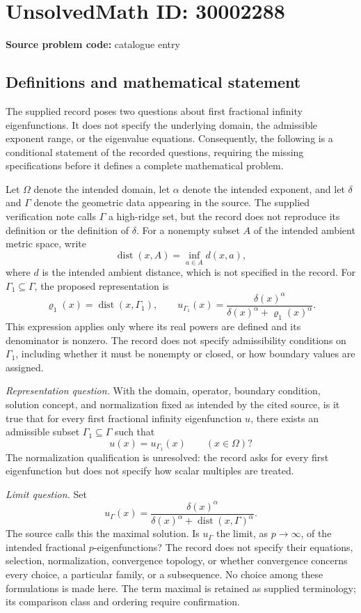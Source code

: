 \documentclass[11pt]{article}
\begin{document}
\section*{UnsolvedMath ID: 30002288}
\textbf{Source problem code:} catalogue entry
\subsection{Definitions and mathematical statement}
The supplied record poses two questions about first fractional infinity eigenfunctions. It does not specify the underlying domain, the admissible exponent range, or the eigenvalue equations. Consequently, the following is a conditional statement of the recorded questions, requiring the missing specifications before it defines a complete mathematical problem.

Let \(\Omega\) denote the intended domain, let \(\alpha\) denote the intended exponent, and let \(\delta\) and \(\Gamma\) denote the geometric data appearing in the source. The supplied verification note calls \(\Gamma\) a high-ridge set, but the record does not reproduce its definition or the definition of \(\delta\). For a nonempty subset \(A\) of the intended ambient metric space, write
\[
\operatorname{dist}(x,A)=\inf_{a\in A}d(x,a),
\]
where \(d\) is the intended ambient distance, which is not specified in the record. For \(\Gamma_1\subseteq\Gamma\), the proposed representation is
\[
\varrho_1(x)=\operatorname{dist}(x,\Gamma_1),\qquad
u_{\Gamma_1}(x)=\frac{\delta(x)^\alpha}{\delta(x)^\alpha+\varrho_1(x)^\alpha}.
\]
This expression applies only where its real powers are defined and its denominator is nonzero. The record does not specify admissibility conditions on \(\Gamma_1\), including whether it must be nonempty or closed, or how boundary values are assigned.

\emph{Representation question.} With the domain, operator, boundary condition, solution concept, and normalization fixed as intended by the cited source, is it true that for every first fractional infinity eigenfunction \(u\), there exists an admissible subset \(\Gamma_1\subseteq\Gamma\) such that
\[
u(x)=u_{\Gamma_1}(x)\qquad(x\in\Omega)?
\]
The normalization qualification is unresolved: the record asks for every first eigenfunction but does not specify how scalar multiples are treated.

\emph{Limit question.} Set
\[
u_{\Gamma}(x)=\frac{\delta(x)^\alpha}{\delta(x)^\alpha+\operatorname{dist}(x,\Gamma)^\alpha}.
\]
The source calls this the maximal solution. Is \(u_{\Gamma}\) the limit, as \(p\to\infty\), of the intended fractional \(p\)-eigenfunctions? The record does not specify their equations, selection, normalization, convergence topology, or whether convergence concerns every choice, a particular family, or a subsequence. No choice among these formulations is made here. The term maximal is retained as supplied terminology; its comparison class and ordering require confirmation.
\end{document}
